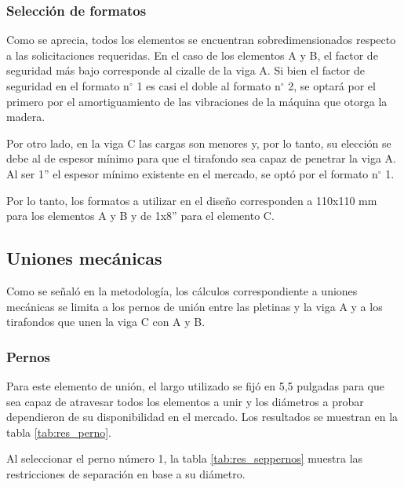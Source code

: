 \subsubsection{Selección de formatos}
Como se aprecia, todos los elementos se encuentran sobredimensionados respecto a las solicitaciones requeridas. En el caso de los elementos A y B, el factor de seguridad más bajo corresponde al cizalle de la viga A. Si bien el factor de seguridad en el formato n$^{\circ}$ 1 es casi el doble al formato n$^{\circ}$ 2, se optará por el primero por el amortiguamiento de las vibraciones de la máquina que otorga la madera.

Por otro lado, en la viga C las cargas son menores y, por lo tanto, su elección se debe al de espesor mínimo para que el tirafondo sea capaz de penetrar la viga A. Al ser 1'' el espesor mínimo existente en el mercado, se optó por el formato n$^{\circ}$ 1.

Por lo tanto, los formatos a utilizar en el diseño corresponden a 110x110 mm para los elementos A y B y de 1x8'' para el elemento C.

\subsection{Uniones mecánicas}

Como se señaló en la metodología, los cálculos correspondiente a uniones mecánicas se limita a los pernos de unión entre las pletinas y la viga A y a los tirafondos que unen la viga C con A y B.

\subsubsection{Pernos}
Para este elemento de unión, el largo utilizado se fijó en 5,5 pulgadas para que sea capaz de atravesar todos los elementos a unir y los diámetros a probar dependieron de su disponibilidad en el mercado. Los resultados se muestran en la tabla \ref{tab:res_perno}. 

Al seleccionar el perno número 1, la tabla \ref{tab:res_seppernos} muestra las restricciones de separación en base a su diámetro.

\begin{table}[h]
\centering
\caption{Cargas admisibles y factor de seguridad para distintos pernos hexagonales.}
\label{tab:res_perno}
\end{table}

